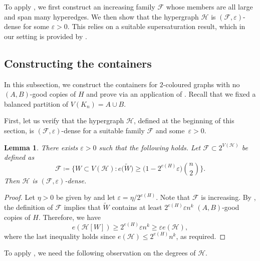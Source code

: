 \documentclass[a4paper,reqno,11pt]{amsart}
\newtheorem{lemma}[theorem]{Lemma}
\theoremstyle{definition}
\theoremstyle{remark}
\newcommand\cH{\mathcal{H}}
\renewcommand\leq{\leqslant}
\renewcommand\geq{\geqslant}
\renewcommand\ge{\geqslant}
\def\cF{\mathcal{F}}
\begin{document}
To apply , we first construct an increasing family $\cF$ whose members are all large and span many hyperedges. We then show that the hypergraph $\cH$ is $(\cF,\varepsilon)$-dense for some $\varepsilon>0$. This relies on a suitable supersaturation result, which in our setting is provided by .

\subsection{Constructing the containers} In this subsection, we construct the containers for $2$-coloured graphs with no $(A,B)$-good copies of $H$ and prove  via an application of . Recall that we fixed a balanced partition of $V(K_n)=A\cup B$. 

First, let us verify that the hypergraph $\cH$, defined at the beginning of this section, is $(\cF, \varepsilon)$-dense for a suitable family $\cF$ and some~$\varepsilon>0$.

\begin{lemma}\label{lem:dense}
There exists $\varepsilon>0$ such that the following holds. Let $\cF \subset 2^{V(\cH)}$ be defined as
\[\cF \coloneqq \Big\{W \subset V(\cH) \colon e\big(\widetilde{W}\big) \ge \big(1 - 2^{e(H)}\varepsilon\big) \binom{n}{2}\Big\}.\]
Then $\cH$ is $(\cF, \varepsilon)$-dense.
\end{lemma}
\begin{proof}
Let $\eta>0$ be given by  and let $\varepsilon = \eta/2^{e(H)}$. Note that $\cF$ is increasing. By , the definition of $\cF$ implies that $\widetilde{W}$ contains at least $2^{e(H)}\varepsilon n^{k}$ $(A,B)$-good copies of $H$. Therefore, we have
\[e(\cH[W])\geq 2^{e(H)}\varepsilon n^{k}\geq
\varepsilon e(\cH),\]
where the last inequality holds since $e(\cH)\leq 2^{e(H)}n^{k}$, as required.
\end{proof}

To apply , we need the following observation on the degrees of $\cH$.
\end{document}
